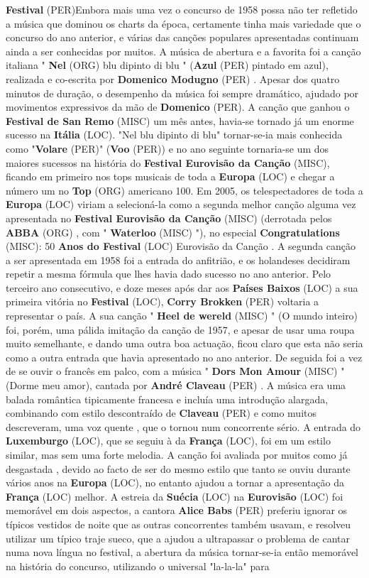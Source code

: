 \documentclass[12pt,a4paper]{article}
\begin{document}
\textbf{Festival} (PER)Embora mais uma vez o concurso de 1958 possa não ter refletido a música que dominou os charts da época, certamente tinha mais variedade que o concurso do ano anterior, e várias das canções populares apresentadas continuam ainda a ser conhecidas por muitos. A música de abertura e a favorita foi a canção italiana " \textbf{Nel} (ORG) blu dipinto di blu " (\textbf{Azul} (PER) pintado em azul), realizada e co-escrita por \textbf{Domenico Modugno} (PER) . Apesar dos quatro minutos de duração, o desempenho da música foi sempre dramático, ajudado por movimentos expressivos da mão de \textbf{Domenico} (PER). A canção que ganhou o \textbf{Festival de San Remo} (MISC) um mês antes, havia-se tornado já um enorme sucesso na \textbf{Itália} (LOC). "Nel blu dipinto di blu" tornar-se-ia mais conhecida como "\textbf{Volare} (PER)" (\textbf{Voo} (PER)) e no ano seguinte tornaria-se um dos maiores sucessos na história do \textbf{Festival Eurovisão da Canção} (MISC), ficando em primeiro nos tops musicais de toda a \textbf{Europa} (LOC) e chegar a número um no \textbf{Top} (ORG) americano 100. Em 2005, os telespectadores de toda a \textbf{Europa} (LOC) viriam a selecioná-la como a segunda melhor canção alguma vez apresentada no \textbf{Festival Eurovisão da Canção} (MISC) (derrotada pelos \textbf{ABBA} (ORG) , com " \textbf{Waterloo} (MISC) "), no especial \textbf{Congratulations} (MISC): 50 \textbf{Anos do Festival} (LOC) Eurovisão da Canção . A segunda canção a ser apresentada em 1958 foi a entrada do anfitrião, e os holandeses decidiram repetir a mesma fórmula que lhes havia dado sucesso no ano anterior. Pelo terceiro ano consecutivo, e doze meses após dar aos \textbf{Países Baixos} (LOC) a sua primeira vitória no \textbf{Festival} (LOC), \textbf{Corry Brokken} (PER) voltaria a representar o país. A sua canção " \textbf{Heel de wereld} (MISC) " (O mundo inteiro) foi, porém, uma pálida imitação da canção de 1957, e apesar de usar uma roupa muito semelhante, e dando uma outra boa actuação, ficou claro que esta não seria como a outra entrada que havia apresentado no ano anterior. De seguida foi a vez de se ouvir o francês em palco, com a música " \textbf{Dors Mon Amour} (MISC) " (Dorme meu amor), cantada por \textbf{André Claveau} (PER) . A música era uma balada romântica tipicamente francesa e incluía uma introdução alargada, combinando com estilo descontraído de \textbf{Claveau} (PER) e como muitos descreveram, uma voz quente , que o tornou num concorrente sério. A entrada do \textbf{Luxemburgo} (LOC), que se seguiu à da \textbf{França} (LOC), foi em um estilo similar, mas sem uma forte melodia. A canção foi avaliada por muitos como já desgastada , devido ao facto de ser do mesmo estilo que tanto se ouviu durante vários anos na \textbf{Europa} (LOC), no entanto ajudou a tornar a apresentação da \textbf{França} (LOC) melhor. A estreia da \textbf{Suécia} (LOC) na \textbf{Eurovisão} (LOC) foi memorável em dois aspectos, a cantora \textbf{Alice Babs} (PER) preferiu ignorar os típicos vestidos de noite que as outras concorrentes também usavam, e resolveu utilizar um típico traje sueco, que a ajudou a ultrapassar o problema de cantar numa nova língua no festival, a abertura da música tornar-se-ia então memorável na história do concurso, utilizando o universal "la-la-la" para 
\end{document}
